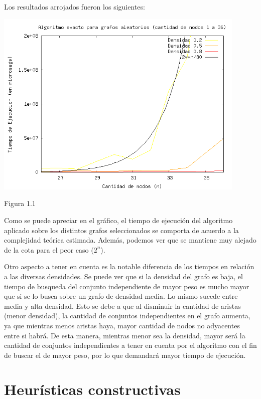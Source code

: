 \documentclass[a4paper,11pt] {article}
\begin{document}
Los resultados arrojados fueron los siguientes:

\begin{center}
 \includegraphics[width=0.9\textwidth]{graficos/tiemposExacto.png}
\begin{center}
Figura 1.1
\end{center}
\end{center}

Como se puede apreciar en el gr\'afico, el tiempo de ejecuci\'on del algoritmo aplicado sobre los distintos grafos seleccionados se comporta de acuerdo a la complejidad te\'orica estimada. Adem\'as, podemos ver que se mantiene muy alejado de la cota para el peor caso ($2^{n}$).

Otro aspecto a tener en cuenta es la notable diferencia de los tiempos en relaci\'on a las diversas densidades. Se puede ver que si la densidad del grafo es baja, el tiempo de busqueda del conjunto independiente de mayor peso es mucho mayor que si se lo busca sobre un grafo de densidad media. Lo mismo sucede entre media y alta densidad. Esto se debe a que al disminuir la cantidad de aristas (menor densidad), la cantidad de conjuntos independientes en el grafo aumenta, ya que mientras menos aristas haya, mayor cantidad de nodos no adyacentes entre si habr\'a. De esta manera, mientras menor sea la densidad, mayor ser\'a la cantidad de conjuntos independientes a tener en cuenta por el algoritmo con el fin de buscar el de mayor peso, por lo que demandar\'a mayor tiempo de ejecuci\'on.

\bigskip

\section{Heur\'isticas constructivas}
\end{document}
